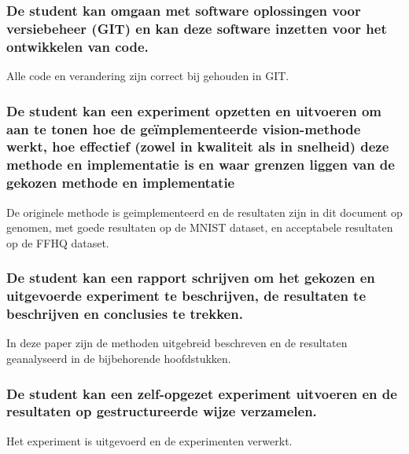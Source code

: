 \subsubsection{De student kan omgaan met software oplossingen voor versiebeheer (GIT) en kan deze
    software inzetten voor het ontwikkelen van code.}
Alle code en verandering zijn correct bij gehouden in GIT.
\subsubsection{De student kan een experiment opzetten en uitvoeren om aan te tonen hoe de
    geïmplementeerde vision-methode werkt, hoe effectief (zowel in kwaliteit als in snelheid)
    deze methode en implementatie is en waar grenzen liggen van de gekozen methode en implementatie}
De originele methode is geimplementeerd en de resultaten zijn in dit document op genomen, met
goede resultaten op de MNIST dataset, en acceptabele resultaten op de FFHQ dataset.
\subsubsection{De student kan een rapport schrijven om het gekozen en uitgevoerde experiment te
    beschrijven, de resultaten te beschrijven en conclusies te trekken.}
In deze paper zijn de methoden uitgebreid beschreven en de resultaten geanalyseerd in de
bijbehorende hoofdstukken.
\subsubsection{De student kan een zelf-opgezet experiment uitvoeren en de resultaten op
    gestructureerde wijze verzamelen.}
Het experiment is uitgevoerd en de experimenten verwerkt.
